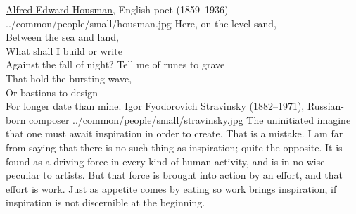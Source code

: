 ﻿%
\cleartooddpage%
\thispagestyle{empty}%
\mbox{}\vfill
{}
\begin{large}
\qboxnpqt
  {\href{http://en.wikipedia.org/wiki/Housman}{Alfred Edward Housman}, English poet (1859--1936)
    \footnotemark
  }{../common/people/small/housman.jpg}
  {Here, on the level sand, \\
    Between the sea and land, \\
    What shall I build or write \\
    Against the fall of night?
  }{Tell me of runes to grave \\
    That hold the bursting wave, \\
    Or bastions to design \\
    For longer date than mine.
  }
\vfill
\label{quotepair}
\qboxnps
  {
    \href{http://en.wikipedia.org/wiki/Igor_Stravinsky}{Igor Fyodorovich Stravinsky}
    (1882--1971), Russian-born composer
    \footnotemark
  }{../common/people/small/stravinsky.jpg}
  {The uninitiated imagine that one must await inspiration in order to create.
   That is a mistake.
   I am far from saying that there is no such thing as inspiration;
   quite the opposite.
   It is found as a driving force in every kind of human activity, 
   and is in no wise peculiar to artists.
   But that force is brought into action by an effort, 
   and that effort is work.
   Just as appetite comes by eating so work brings inspiration, 
   if inspiration is not discernible at the beginning.
  }

\end{large}
